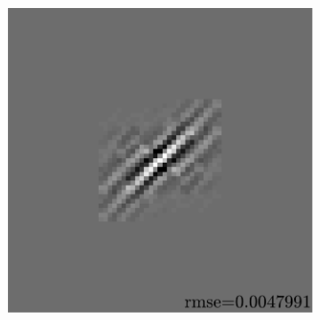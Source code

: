 \begin{figure}[!ht]
\begin{subfigure}[b]{0.09\textwidth}
	\caption{}
\end{subfigure}
\begin{subfigure}[b]{0.39\textwidth}\centering
	\includegraphics[width=\textwidth]{figures/exple-better-support/xp_128x128_sc2_angl1_K3_S3_node4classic_approx.pdf}
	\caption{}
\end{subfigure}
\begin{subfigure}[b]{0.09\textwidth}\centering

\end{subfigure}
\end{figure}
